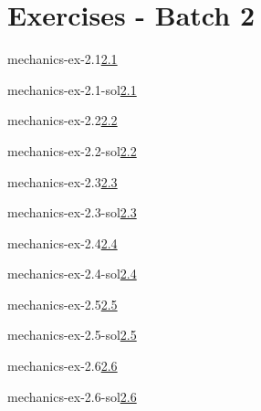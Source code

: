 \documentclass[preview]{standalone}
\begin{document}
\genpage

\section{Exercises - Batch 2}

\begin{snippetexercise}{mechanics-ex-2.1}{\underline{2.1}}
    \todo
\end{snippetexercise}

\begin{snippetsolution}{mechanics-ex-2.1-sol}{\underline{2.1}}
    \todo
\end{snippetsolution}

\begin{snippetexercise}{mechanics-ex-2.2}{\underline{2.2}}
    \todo
\end{snippetexercise}

\begin{snippetsolution}{mechanics-ex-2.2-sol}{\underline{2.2}}
    \todo
\end{snippetsolution}

\begin{snippetexercise}{mechanics-ex-2.3}{\underline{2.3}}
    \todo
\end{snippetexercise}

\begin{snippetsolution}{mechanics-ex-2.3-sol}{\underline{2.3}}
    \todo
\end{snippetsolution}

\begin{snippetexercise}{mechanics-ex-2.4}{\underline{2.4}}
    \todo
\end{snippetexercise}

\begin{snippetsolution}{mechanics-ex-2.4-sol}{\underline{2.4}}
    \todo
\end{snippetsolution}

\begin{snippetexercise}{mechanics-ex-2.5}{\underline{2.5}}
    \todo
\end{snippetexercise}

\begin{snippetsolution}{mechanics-ex-2.5-sol}{\underline{2.5}}
    \todo
\end{snippetsolution}

\begin{snippetexercise}{mechanics-ex-2.6}{\underline{2.6}}
    \todo
\end{snippetexercise}

\begin{snippetsolution}{mechanics-ex-2.6-sol}{\underline{2.6}}
    \todo
\end{snippetsolution}
\end{document}
